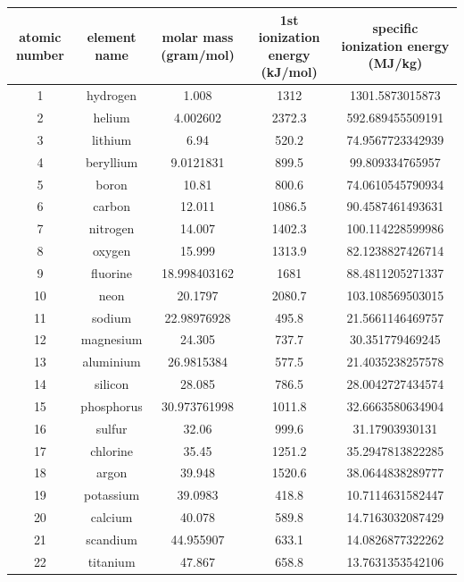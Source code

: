 \documentclass[a4paper]{article}
\begin{document}
	\scriptsize
	
	\begin{center}
	\begin{tabular}{|c|c|c|c|c|}
		\hline
		atomic number & element name & molar mass (gram/mol) & 1st ionization energy (kJ/mol) & specific ionization energy (MJ/kg) \\
		\hline
		1 & hydrogen & 1.008 & 1312 & 1301.5873015873 \\
		\hline
		2 & helium & 4.002602 & 2372.3 & 592.689455509191 \\
		\hline
		3 & lithium & 6.94 & 520.2 & 74.9567723342939 \\
		\hline
		4 & beryllium & 9.0121831 & 899.5 & 99.809334765957 \\
		\hline
		5 & boron & 10.81 & 800.6 & 74.0610545790934 \\
		\hline
		6 & carbon & 12.011 & 1086.5 & 90.4587461493631 \\
		\hline
		7 & nitrogen & 14.007 & 1402.3 & 100.114228599986 \\
		\hline
		8 & oxygen & 15.999 & 1313.9 & 82.1238827426714 \\
		\hline
		9 & fluorine & 18.998403162 & 1681 & 88.4811205271337 \\
		\hline
		10 & neon & 20.1797 & 2080.7 & 103.108569503015 \\
		\hline
		11 & sodium & 22.98976928 & 495.8 & 21.5661146469757 \\
		\hline
		12 & magnesium & 24.305 & 737.7 & 30.351779469245 \\
		\hline
		13 & aluminium & 26.9815384 & 577.5 & 21.4035238257578 \\
		\hline
		14 & silicon & 28.085 & 786.5 & 28.0042727434574 \\
		\hline
		15 & phosphorus & 30.973761998 & 1011.8 & 32.6663580634904 \\
		\hline
		16 & sulfur & 32.06 & 999.6 & 31.17903930131 \\
		\hline
		17 & chlorine & 35.45 & 1251.2 & 35.2947813822285 \\
		\hline
		18 & argon & 39.948 & 1520.6 & 38.0644838289777 \\
		\hline
		19 & potassium & 39.0983 & 418.8 & 10.7114631582447 \\
		\hline
		20 & calcium & 40.078 & 589.8 & 14.7163032087429 \\
		\hline
		21 & scandium & 44.955907 & 633.1 & 14.0826877322262 \\
		\hline
		22 & titanium & 47.867 & 658.8 & 13.7631353542106 \\

\end{tabular}
\end{center}
\end{document}
